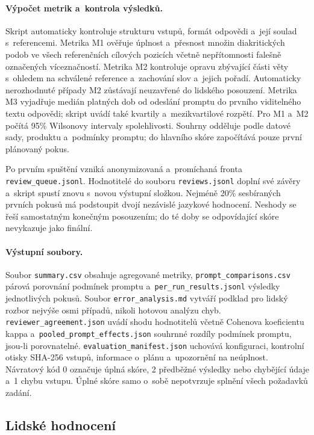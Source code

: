 \documentclass[11pt,a4paper]{article}
\begin{document}
\paragraph{Výpočet metrik a~kontrola výsledků.}
Skript automaticky kontroluje strukturu vstupů, formát odpovědi
a~její soulad s~referencemi. Metrika M1 ověřuje úplnost a~přesnost
množin diakritických podob ve všech referenčních cílových pozicích
včetně nepřítomnosti falešně označených víceznačností. Metrika M2
kontroluje opravu zbývající části věty s~ohledem na schválené
reference a~zachování slov a~jejich pořadí. Automaticky nerozhodnuté
případy M2 zůstávají neuzavřené do lidského posouzení. Metrika M3
vyjadřuje medián platných dob od odeslání promptu do prvního
viditelného textu odpovědi; skript uvádí také kvartily a~mezikvartilové
rozpětí. Pro M1 a~M2 počítá 95\% Wilsonovy intervaly spolehlivosti.
Souhrny odděluje podle datové sady, produktu a~podmínky promptu;
do hlavního skóre započítává pouze první plánovaný pokus.

Po prvním spuštění vzniká anonymizovaná a~promíchaná fronta
\texttt{review\_queue.jsonl}. Hodnotitelé do souboru
\texttt{reviews.jsonl} doplní své závěry a~skript spustí znovu s~novou
výstupní složkou. Nejméně 20\% sesbíraných prvních pokusů má
podstoupit dvojí nezávislé jazykové hodnocení. Neshody se řeší
samostatným konečným posouzením; do té doby se odpovídající skóre
nevykazuje jako finální.

\paragraph{Výstupní soubory.}
Soubor \texttt{summary.csv} obsahuje agregované metriky,
\texttt{prompt\_comparisons.csv} párová porovnání podmínek promptu
a~\texttt{per\_run\_results.jsonl} výsledky jednotlivých pokusů.
Soubor \texttt{error\_analysis.md} vytváří podklad pro lidský rozbor
nejvýše osmi případů, nikoli hotovou analýzu chyb.
\texttt{reviewer\_agreement.json} uvádí shodu hodnotitelů včetně
Cohenova koeficientu kappa a~\texttt{pooled\_prompt\_effects.json}
souhrnné rozdíly podmínek promptu, jsou-li porovnatelné.
\texttt{evaluation\_manifest.json} uchovává konfiguraci, kontrolní
otisky SHA-256 vstupů, informace o~plánu a~upozornění na neúplnost.
Návratový kód 0 označuje úplná skóre, 2 předběžné výsledky nebo
chybějící údaje a~1 chybu vstupu. Úplné skóre samo o~sobě
nepotvrzuje splnění všech požadavků zadání.

\subsection{Lidské hodnocení}
\label{sec:lidske-hodnoceni}
\end{document}
